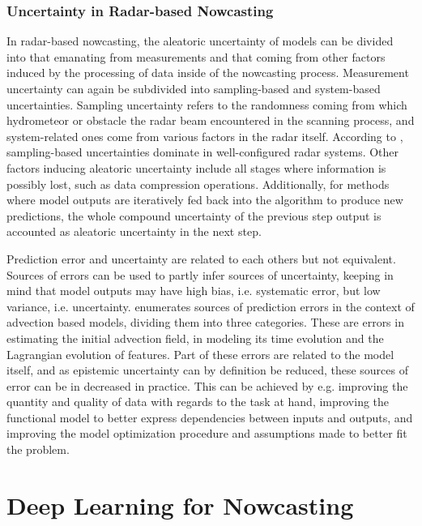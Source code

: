 \subsubsection*{Uncertainty in Radar-based Nowcasting}

In radar-based nowcasting, the aleatoric uncertainty of models can be divided into that emanating from measurements and that coming from other factors induced by the processing of data inside of the nowcasting process. Measurement uncertainty can again be subdivided into sampling-based and system-based uncertainties. Sampling uncertainty refers to the randomness coming from which hydrometeor or obstacle the radar beam encountered in the scanning process, and system-related ones come from various factors in the radar itself. According to \citet{cao_measurement_2016}, sampling-based uncertainties dominate in well-configured radar systems. Other factors inducing aleatoric uncertainty include all stages where information is possibly lost, such as data compression operations. Additionally, for methods where model outputs are iteratively fed back into the algorithm to produce new predictions, the whole compound uncertainty of the previous step output is accounted as aleatoric uncertainty in the next step. 


Prediction error and uncertainty are related to each others but not equivalent. Sources of errors can be used to partly infer sources of uncertainty, keeping in mind that model outputs may have high bias, i.e. systematic error, but low variance, i.e. uncertainty. \citet{bowler_steps_2006} enumerates sources of prediction errors in the context of advection based models, dividing them into three categories. These are errors in estimating the initial advection field, in modeling its time evolution and the Lagrangian evolution of features. Part of these errors are related to the model itself, and as epistemic uncertainty can by definition be reduced, these sources of error can be in decreased in practice. This can be achieved by e.g. improving the quantity and quality of data with regards to the task at hand, improving the functional model to better express dependencies between inputs and outputs, and improving the model optimization procedure and assumptions made to better fit the problem.%



\section{Deep Learning for Nowcasting}
\label{section:dl_for_nc}

